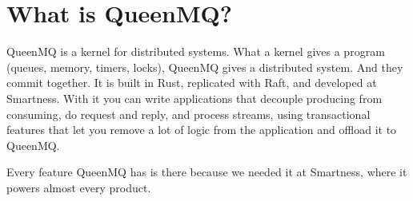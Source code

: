
\section{What is QueenMQ?}


QueenMQ is a kernel for distributed systems. What a kernel gives a program (queues, memory,
timers, locks), QueenMQ gives a distributed system. And they commit together. It is built in
Rust, replicated with Raft, and developed at Smartness. With it you can write applications that decouple producing from consuming, do request
and reply, and process streams, using transactional features that let you remove a lot of logic
from the application and offload it to QueenMQ.

Every feature QueenMQ has is there because we needed it at Smartness, where it powers almost
every product.
